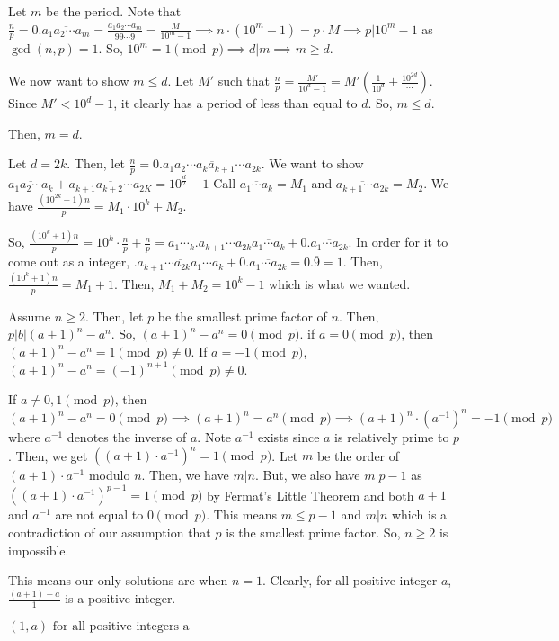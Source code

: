 \documentclass[11pt]{article}
\begin{document}
\begin{sol}[1]
Let $m$ be the period. Note that $\frac{n}{p}=0.\overline{a_{1}a_{2}\cdots a_{m}}=\frac{a_{1}a_{2}\cdots a_{m}}{\overline{99\cdots 9}}=\frac{M}{10^{m}-1}\implies n\cdot (10^{m}-1)=p\cdot M\implies p|10^{m}-1$ as $\gcd(n,p)=1$. So, $10^{m}=1\pmod{p}\implies d|m\implies m\ge d$.

We now want to show $m\leq d$. Let $M'$ such that $\frac{n}{p}=\frac{M'}{10^{d}-1}=M'(\frac{1}{10^d}+\frac{10^{2d}}\cdots)$. Since $M'< 10^{d}-1$, it clearly has a period of less than equal to $d$. So, $m\leq d$.

Then, $m=d$.
\end{sol}

\begin{sol}[2]
Let $d=2k$. Then, let $\frac{n}{p}=0.\overline{a_{1}a_{2}\cdots a_{k}a_{k+1}\cdots a_{2k}}$. We want to show $\overline{a_{1}a_{2}\cdots a_{k}} + \overline{a_{k+1}a_{k+2}\cdots a_{2K}} = 10^{\frac{d}{2}}-1$ Call $\overline{a_{1}\cdots a_{k}}=M_{1}$ and $\overline{a_{k+1}\cdots a_{2k}}=M_{2}$. We have $\frac{(10^{2k}-1)n}{p}=M_{1}\cdot 10^{k}+M_{2}$.

So, $\frac{(10^{k}+1)n}{p}=10^{k}\cdot \frac{n}{p}+\frac{n}{p}=a_{1}\cdots_{k}.a_{k+1}\cdots a_{2k}\overline{a_{1}\cdots a_{k}} + 0.\overline{a_{1}\cdots a_{2k}}$. In order for it to come out as a integer, $.\overline{a_{k+1}\cdots a_{2k}a_{1}\cdots a_{k}}+0.\overline{a_{1}\cdots a_{2k}}=0.\overline{9}=1$.  Then, $\frac{(10^{k}+1)n}{p}=M_{1}+1$.  Then, $M_{1}+M_{2}=10^{k}-1$ which is what we wanted.
\end{sol}


\begin{sol}
Assume $n\ge 2$. Then, let $p$ be the smallest prime factor of $n$. Then, $p|b|(a+1)^{n}-a^{n}$. So, $(a+1)^{n}-a^{n}=0\pmod{p}$. if $a=0\pmod{p}$, then $(a+1)^{n}-a^{n}=1\pmod{p}\neq 0$. If $a=-1\pmod{p}$, $(a+1)^{n}-a^{n}=(-1)^{n+1}\pmod{p}\neq 0$.

 If $a\neq 0,1\pmod{p}$, then $(a+1)^{n}-a^{n}=0\pmod{p}\implies (a+1)^{n}=a^{n}\pmod{p}\implies (a+1)^{n}\cdot (a^{-1})^{n}=-1\pmod{p}$ where $a^{-1}$ denotes the inverse of $a$. Note $a^{-1}$ exists since $a$ is relatively prime to $p$. Then, we get $((a+1)\cdot a^{-1})^{n}=1\pmod{p}$. Let $m$ be the order of $(a+1)\cdot a^{-1}$ modulo $n$. Then, we have $m|n$. But, we also have $m|p-1$ as $((a+1)\cdot a^{-1})^{p-1}=1\pmod{p}$ by Fermat\rq{s} Little Theorem and both $a+1$ and $a^{-1}$ are not equal to $0\pmod{p}$.  This means $m\leq p-1$ and $m|n$ which is a contradiction of our assumption that $p$ is the smallest prime factor. So, $n\ge 2$ is impossible.
 
 This means our only solutions are when $n=1$. Clearly, for all positive integer $a$, $\frac{(a+1)-a}{1}$ is a positive integer.
 
 $\boxed{(1,a) \text{ for all positive integers a}}$
\end{sol}
\end{document}
